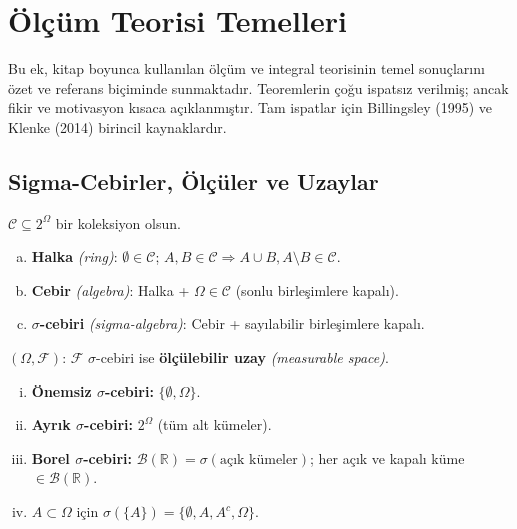 \chapter{Ölçüm Teorisi Temelleri}
\label{app:olcum_teorisi}

Bu ek, kitap boyunca kullanılan ölçüm ve integral teorisinin temel sonuçlarını özet ve referans biçiminde sunmaktadır. Teoremlerin çoğu ispatsız verilmiş; ancak fikir ve motivasyon kısaca açıklanmıştır. Tam ispatlar için Billingsley (1995) ve Klenke (2014) birincil kaynaklardır.

\section{Sigma-Cebirler, Ölçüler ve Uzaylar}
\label{app:sigma_olcu}

\begin{tanim}\label{app:def:sigma}
$\mathcal{C}\subseteq 2^\Omega$ bir koleksiyon olsun.
\begin{enumerate}[(a)]
  \item \textbf{Halka} \emph{(ring)}: $\emptyset\in\mathcal{C}$; $A,B\in\mathcal{C}\Rightarrow A\cup B, A\setminus B\in\mathcal{C}$.
  \item \textbf{Cebir} \emph{(algebra)}: Halka + $\Omega\in\mathcal{C}$ (sonlu birleşimlere kapalı).
  \item \textbf{$\sigma$-cebiri} \emph{(sigma-algebra)}: Cebir + sayılabilir birleşimlere kapalı.
\end{enumerate}
$(\Omega,\mathcal{F})$: $\mathcal{F}$ $\sigma$-cebiri ise \textbf{ölçülebilir uzay} \emph{(measurable space)}.
\end{tanim}

\begin{ornek}
\begin{enumerate}[(i)]
  \item \textbf{Önemsiz $\sigma$-cebiri:} $\{\emptyset,\Omega\}$.
  \item \textbf{Ayrık $\sigma$-cebiri:} $2^\Omega$ (tüm alt kümeler).
  \item \textbf{Borel $\sigma$-cebiri:} $\mathcal{B}(\mathbb{R}) = \sigma(\text{açık kümeler})$; her açık ve kapalı küme $\in\mathcal{B}(\mathbb{R})$.
  \item $A\subset\Omega$ için $\sigma(\{A\}) = \{\emptyset, A, A^c, \Omega\}$.
\end{enumerate}
\end{ornek}

